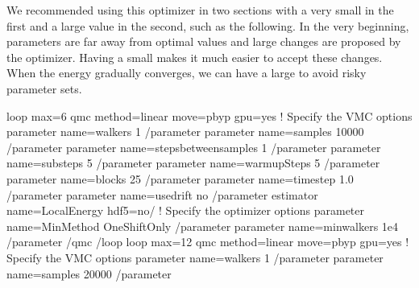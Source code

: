 \documentclass[letterpaper,10pt,english]{sphinxmanual}
\begin{document}
We recommended using this optimizer in two sections with a very small  in the first and a large value in the second, such as the following.
In the very beginning, parameters are far away from optimal values and large changes are proposed by the optimizer.
Having a small  makes it much easier to accept these changes.
When the energy gradually converges, we can have a large  to avoid risky parameter sets.

\begin{sphinxVerbatim}[commandchars=\\\{\}]
\PYGZlt{}loop max=\PYGZdq{}6\PYGZdq{}\PYGZgt{}
 \PYGZlt{}qmc method=\PYGZdq{}linear\PYGZdq{} move=\PYGZdq{}pbyp\PYGZdq{} gpu=\PYGZdq{}yes\PYGZdq{}\PYGZgt{}
   \PYGZlt{}!\PYGZhy{}\PYGZhy{} Specify the VMC options \PYGZhy{}\PYGZhy{}\PYGZgt{}
   \PYGZlt{}parameter name=\PYGZdq{}walkers\PYGZdq{}\PYGZgt{}                1 \PYGZlt{}/parameter\PYGZgt{}
   \PYGZlt{}parameter name=\PYGZdq{}samples\PYGZdq{}\PYGZgt{}            10000 \PYGZlt{}/parameter\PYGZgt{}
   \PYGZlt{}parameter name=\PYGZdq{}stepsbetweensamples\PYGZdq{}\PYGZgt{}    1 \PYGZlt{}/parameter\PYGZgt{}
   \PYGZlt{}parameter name=\PYGZdq{}substeps\PYGZdq{}\PYGZgt{}               5 \PYGZlt{}/parameter\PYGZgt{}
   \PYGZlt{}parameter name=\PYGZdq{}warmupSteps\PYGZdq{}\PYGZgt{}            5 \PYGZlt{}/parameter\PYGZgt{}
   \PYGZlt{}parameter name=\PYGZdq{}blocks\PYGZdq{}\PYGZgt{}                25 \PYGZlt{}/parameter\PYGZgt{}
   \PYGZlt{}parameter name=\PYGZdq{}timestep\PYGZdq{}\PYGZgt{}             1.0 \PYGZlt{}/parameter\PYGZgt{}
   \PYGZlt{}parameter name=\PYGZdq{}usedrift\PYGZdq{}\PYGZgt{}              no \PYGZlt{}/parameter\PYGZgt{}
   \PYGZlt{}estimator name=\PYGZdq{}LocalEnergy\PYGZdq{} hdf5=\PYGZdq{}no\PYGZdq{}/\PYGZgt{}
   \PYGZlt{}!\PYGZhy{}\PYGZhy{} Specify the optimizer options \PYGZhy{}\PYGZhy{}\PYGZgt{}
   \PYGZlt{}parameter name=\PYGZdq{}MinMethod\PYGZdq{}\PYGZgt{}    OneShiftOnly \PYGZlt{}/parameter\PYGZgt{}
   \PYGZlt{}parameter name=\PYGZdq{}minwalkers\PYGZdq{}\PYGZgt{}           1e\PYGZhy{}4 \PYGZlt{}/parameter\PYGZgt{}
 \PYGZlt{}/qmc\PYGZgt{}
\PYGZlt{}/loop\PYGZgt{}
\PYGZlt{}loop max=\PYGZdq{}12\PYGZdq{}\PYGZgt{}
 \PYGZlt{}qmc method=\PYGZdq{}linear\PYGZdq{} move=\PYGZdq{}pbyp\PYGZdq{} gpu=\PYGZdq{}yes\PYGZdq{}\PYGZgt{}
   \PYGZlt{}!\PYGZhy{}\PYGZhy{} Specify the VMC options \PYGZhy{}\PYGZhy{}\PYGZgt{}
   \PYGZlt{}parameter name=\PYGZdq{}walkers\PYGZdq{}\PYGZgt{}                1 \PYGZlt{}/parameter\PYGZgt{}
   \PYGZlt{}parameter name=\PYGZdq{}samples\PYGZdq{}\PYGZgt{}            20000 \PYGZlt{}/parameter\PYGZgt{}

\end{sphinxVerbatim}
\end{document}
